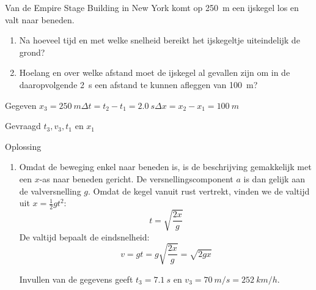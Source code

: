 


\item Van de Empire Stage Building in New York komt op \SI{250}{m} een ijskegel los en valt naar beneden.
\begin{enumerate}
\item Na hoeveel tijd en met welke snelheid bereikt het ijskegeltje uiteindelijk de grond?
\item Hoelang en over welke afstand moet de ijskegel al gevallen zijn om in de daaropvolgende \SI{2}{s} een afstand te kunnen afleggen van \SI{100}{m}?
\end{enumerate}
\begin{oplossing}
\item[Gegeven]$x_3=\SI{250}{m}$\newline$\Delta t=t_2-t_1=\SI{2,0}{s}$\newline$\Delta x=x_2-x_1=\SI{100}{m}$
\item[Gevraagd]$t_3,v_3,t_1$ en $x_1$
\item[Oplossing]
\begin{enumerate}

\item\begin{minipage}[t]{0.63\linewidth}
	Omdat de beweging enkel naar beneden is, is de beschrijving gemakkelijk met een $x$-as naar beneden gericht. De versnellingscomponent $a$ is dan gelijk aan de valversnelling $g$. Omdat de kegel vanuit rust vertrekt, vinden we de valtijd uit $x=\frac{1}{2}gt^2$:
\begin{equation*}
t=\sqrt{\frac{2x}{g}}
\end{equation*}
De valtijd bepaalt de eindsnelheid:
\begin{equation*}
v=gt=g\sqrt{\frac{2x}{g}}=\sqrt{2gx}
\end{equation*}
\end{minipage}%
\begin{minipage}[t]{0.37\linewidth}
\end{minipage}

Invullen van de gegevens geeft $t_3=\SI{7,1}{s}$ en $v_3=\SI{70}{m/s}=\SI{252}{km/h}$.


\end{enumerate}
\end{oplossing}
